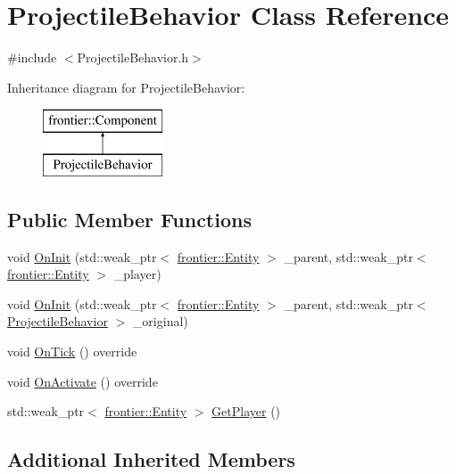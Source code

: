 \hypertarget{class_projectile_behavior}{}\section{Projectile\+Behavior Class Reference}
\label{class_projectile_behavior}


{\ttfamily \#include $<$Projectile\+Behavior.\+h$>$}

Inheritance diagram for Projectile\+Behavior\+:\begin{figure}[H]
\begin{center}
\leavevmode
\includegraphics[height=2.000000cm]{class_projectile_behavior}
\end{center}
\end{figure}
\subsection*{Public Member Functions}
\begin{DoxyCompactItemize}
\item 
void \hyperlink{class_projectile_behavior_ab8caa701affecc1eaddb4bdc17152c23}{On\+Init} (std\+::weak\+\_\+ptr$<$ \hyperlink{classfrontier_1_1_entity}{frontier\+::\+Entity} $>$ \+\_\+parent, std\+::weak\+\_\+ptr$<$ \hyperlink{classfrontier_1_1_entity}{frontier\+::\+Entity} $>$ \+\_\+player)
\item 
void \hyperlink{class_projectile_behavior_a5e356eb4a161e7784c50b14ba39d98d1}{On\+Init} (std\+::weak\+\_\+ptr$<$ \hyperlink{classfrontier_1_1_entity}{frontier\+::\+Entity} $>$ \+\_\+parent, std\+::weak\+\_\+ptr$<$ \hyperlink{class_projectile_behavior}{Projectile\+Behavior} $>$ \+\_\+original)
\item 
void \hyperlink{class_projectile_behavior_a7756651ba998e7f3c0abcafcf25796ae}{On\+Tick} () override
\item 
void \hyperlink{class_projectile_behavior_aa01c813e541f6069d7ca9c69848ca0a6}{On\+Activate} () override
\item 
std\+::weak\+\_\+ptr$<$ \hyperlink{classfrontier_1_1_entity}{frontier\+::\+Entity} $>$ \hyperlink{class_projectile_behavior_ac0f47feec11bc48291c1d8721efe5bd8}{Get\+Player} ()
\end{DoxyCompactItemize}
\subsection*{Additional Inherited Members}


